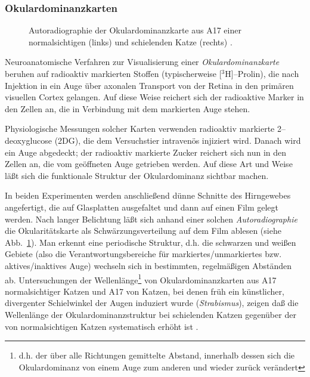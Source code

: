 \subsubsection{Okulardominanzkarten}
\label{odkarten}

\begin{figure}[t]
    \centering
    \begin{minipage}[m]{3.9cm}
    \end{minipage}
    \hskip2cm
    \begin{minipage}[m]{3.9cm}
    \end{minipage}
    \caption{Autoradiographie der Okulardominanzkarte aus A17 einer
    normalsichtigen (links) und schielenden Katze (rechts)
        \parencite[neurophysiologische Methode, Karten aus][]{loewel:1987}.}
    \label{odsiegrid}
\end{figure}

Neuroanatomische Verfahren zur Visualisierung einer
\emph{Okulardominanzkarte} beruhen auf radioaktiv markierten Stoffen
(typischerweise [$^3$H]--Prolin), die nach Injektion in ein Auge über
axonalen Transport von der Retina in den primären visuellen Cortex
gelangen. Auf diese Weise reichert sich der radioaktive Marker in den
Zellen an, die in Verbindung mit dem markierten Auge stehen.

Physiologische Messungen solcher Karten verwenden radioaktiv markierte
2--deoxy\-glucose (2DG), die dem Versuchstier intravenös injiziert
wird. Danach wird ein Auge abgedeckt; der radioaktiv markierte Zucker
reichert sich nun in den Zellen an, die vom geöffneten Auge getrieben
werden. Auf diese Art und Weise läßt sich die funktionale Struktur der
Okulardominanz sichtbar machen.

\setcounter{footnote}{1}
In beiden Experimenten werden anschließend dünne Schnitte des Hirngewebes
angefertigt, die auf Glasplatten ausgefaltet und dann auf einen Film gelegt
werden. Nach langer Belichtung läßt sich anhand einer solchen
\emph{Autoradiographie} die Okularitätskarte als Schwärzungsverteilung
auf dem Film ablesen (siehe Abb.~\ref{odsiegrid}). Man erkennt eine
periodische Struktur, d.h. die schwarzen und weißen Gebiete (also die
Verantwortungsbereiche für markiertes/unmarkiertes bzw. aktives/inaktives
Auge) wechseln sich in bestimmten, regelmäßigen Abständen ab.
Untersuchungen der Wellenlänge\footnote{d.h. der über alle Richtungen
gemittelte Abstand, innerhalb dessen sich die Okulardominanz von einem Auge
zum anderen und wieder zurück verändert} von Okulardominanzkarten aus A17
normalsichtiger Katzen und A17 von Katzen, bei denen früh ein
künstlicher, divergenter Schielwinkel der Augen induziert wurde
(\emph{Strabismus}), zeigen daß die Wellenlänge der
Okulardominanzstruktur bei schielenden Katzen gegenüber der von
normalsichtigen Katzen systematisch erhöht ist \cite{loewel:1994}.
\setcounter{footnote}{1}

